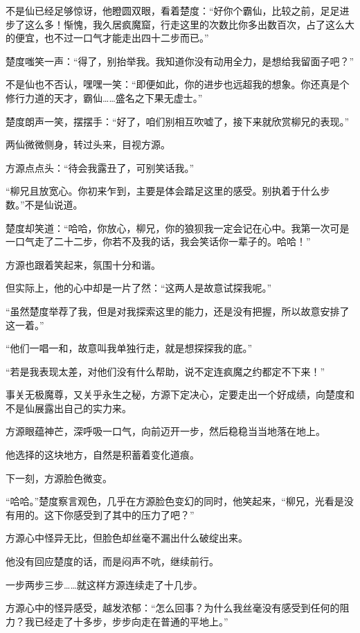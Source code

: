 \begin{this_body}
不是仙已经足够惊讶，他瞪圆双眼，看着楚度：“好你个霸仙，比较之前，足足进步了这么多！惭愧，我久居疯魔窟，行走这里的次数比你多出数百次，占了这么大的便宜，也不过一口气才能走出四十二步而已。”

楚度嗤笑一声：“得了，别抬举我。我知道你没有动用全力，是想给我留面子吧？”

不是仙也不否认，嘿嘿一笑：“即便如此，你的进步也远超我的想象。你还真是个修行力道的天才，霸仙……盛名之下果无虚士。”

楚度朗声一笑，摆摆手：“好了，咱们别相互吹嘘了，接下来就欣赏柳兄的表现。”

两仙微微侧身，转过头来，目视方源。

方源点点头：“待会我露丑了，可别笑话我。”

“柳兄且放宽心。你初来乍到，主要是体会踏足这里的感受。别执着于什么步数。”不是仙说道。

楚度却笑道：“哈哈，你放心，柳兄，你的狼狈我一定会记在心中。我第一次可是一口气走了二十二步，你若不及我的话，我会笑话你一辈子的。哈哈！”

方源也跟着笑起来，氛围十分和谐。

但实际上，他的心中却是一片了然：“这两人是故意试探我呢。”

“虽然楚度举荐了我，但是对我探索这里的能力，还是没有把握，所以故意安排了这一着。”

“他们一唱一和，故意叫我单独行走，就是想探探我的底。”

“若是我表现太差，对他们没有什么帮助，说不定连疯魔之约都定不下来！”

事关无极魔尊，又关乎永生之秘，方源下定决心，定要走出一个好成绩，向楚度和不是仙展露出自己的实力来。

方源眼蕴神芒，深呼吸一口气，向前迈开一步，然后稳稳当当地落在地上。

他选择的这块地方，自然是积蓄着变化道痕。

下一刻，方源脸色微变。

“哈哈。”楚度察言观色，几乎在方源脸色变幻的同时，他笑起来，“柳兄，光看是没有用的。这下你感受到了其中的压力了吧？”

方源心中怪异无比，但脸色却丝毫不漏出什么破绽出来。

他没有回应楚度的话，而是闷声不吭，继续前行。

一步两步三步……就这样方源连续走了十几步。

方源心中的怪异感受，越发浓郁：“怎么回事？为什么我丝毫没有感受到任何的阻力？我已经走了十多步，步步向走在普通的平地上。”


\end{this_body}
